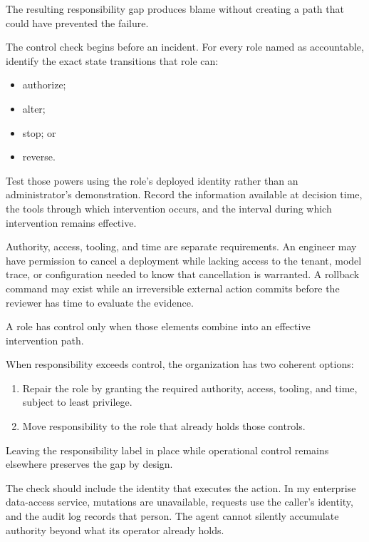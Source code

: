 The resulting responsibility gap produces blame without creating a path that could have prevented the failure.


The control check begins before an incident. For every role named as accountable, identify the exact state transitions that role can:

\begin{itemize}
\tightlist
\item
  authorize;
\item
  alter;
\item
  stop; or
\item
  reverse.
\end{itemize}

Test those powers using the role's deployed identity rather than an administrator's demonstration. Record the information available at decision time, the tools through which intervention occurs, and the interval during which intervention remains effective.

Authority, access, tooling, and time are separate requirements. An engineer may have permission to cancel a deployment while lacking access to the tenant, model trace, or configuration needed to know that cancellation is warranted. A rollback command may exist while an irreversible external action commits before the reviewer has time to evaluate the evidence.

A role has control only when those elements combine into an effective intervention path.


When responsibility exceeds control, the organization has two coherent options:

\begin{enumerate}
\def\labelenumi{\arabic{enumi}.}
\tightlist
\item
  Repair the role by granting the required authority, access, tooling, and time, subject to least privilege.
\item
  Move responsibility to the role that already holds those controls.
\end{enumerate}

Leaving the responsibility label in place while operational control remains elsewhere preserves the gap by design.

The check should include the identity that executes the action. In my enterprise data-access service, mutations are unavailable, requests use the caller's identity, and the audit log records that person. The agent cannot silently accumulate authority beyond what its operator already holds.

